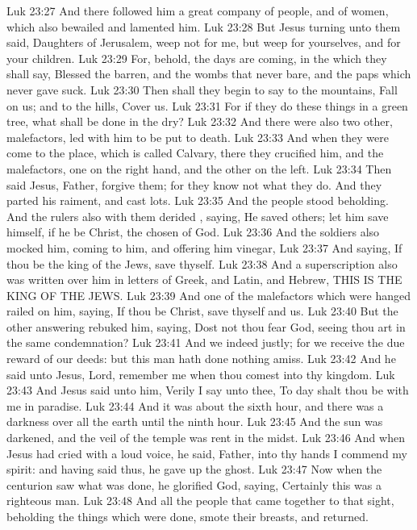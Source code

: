 \vs Luk 23:27 And there followed him a great company of people, and of women, which also bewailed and lamented him.
\vs Luk 23:28 But Jesus turning unto them said, Daughters of Jerusalem, weep not for me, but weep for yourselves, and for your children.
\vs Luk 23:29 For, behold, the days are coming, in the which they shall say, Blessed  the barren, and the wombs that never bare, and the paps which never gave suck.
\vs Luk 23:30 Then shall they begin to say to the mountains, Fall on us; and to the hills, Cover us.
\vs Luk 23:31 For if they do these things in a green tree, what shall be done in the dry?
\vs Luk 23:32 And there were also two other, malefactors, led with him to be put to death.
\vs Luk 23:33 And when they were come to the place, which is called Calvary, there they crucified him, and the malefactors, one on the right hand, and the other on the left.
\vs Luk 23:34 Then said Jesus, Father, forgive them; for they know not what they do. And they parted his raiment, and cast lots.
\vs Luk 23:35 And the people stood beholding. And the rulers also with them derided , saying, He saved others; let him save himself, if he be Christ, the chosen of God.
\vs Luk 23:36 And the soldiers also mocked him, coming to him, and offering him vinegar,
\vs Luk 23:37 And saying, If thou be the king of the Jews, save thyself.
\vs Luk 23:38 And a superscription also was written over him in letters of Greek, and Latin, and Hebrew, THIS IS THE KING OF THE JEWS.
\vs Luk 23:39 And one of the malefactors which were hanged railed on him, saying, If thou be Christ, save thyself and us.
\vs Luk 23:40 But the other answering rebuked him, saying, Dost not thou fear God, seeing thou art in the same condemnation?
\vs Luk 23:41 And we indeed justly; for we receive the due reward of our deeds: but this man hath done nothing amiss.
\vs Luk 23:42 And he said unto Jesus, Lord, remember me when thou comest into thy kingdom.
\vs Luk 23:43 And Jesus said unto him, Verily I say unto thee, To day shalt thou be with me in paradise.
\vs Luk 23:44 And it was about the sixth hour, and there was a darkness over all the earth until the ninth hour.
\vs Luk 23:45 And the sun was darkened, and the veil of the temple was rent in the midst.
\vs Luk 23:46 And when Jesus had cried with a loud voice, he said, Father, into thy hands I commend my spirit: and having said thus, he gave up the ghost.
\vs Luk 23:47 Now when the centurion saw what was done, he glorified God, saying, Certainly this was a righteous man.
\vs Luk 23:48 And all the people that came together to that sight, beholding the things which were done, smote their breasts, and returned.
